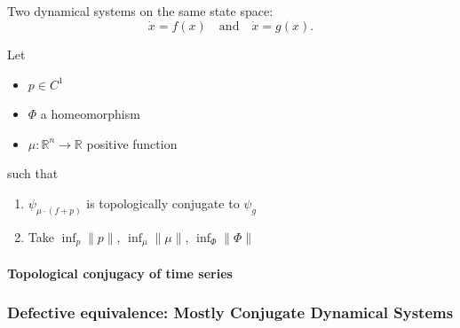 \documentclass{article}
\theoremstyle{definition} \newtheorem{definition}{Definition}  \newtheorem{example}{Example}
\theoremstyle{remark} \newtheorem{remark}{Remark}
\newcommand{\reals}{\mathbb{R}}
\newcounter{ct}
\begin{document}
\subsection{}
Two dynamical systems on the same state space:
\[
\dot{x} = f(x) \quad \text{and} \quad \dot{x} = g(x).
\]

Let 
\begin{itemize}
\item $p\in C^1$
\item $\Phi$ a homeomorphism
\item $\mu\colon \reals^n\rightarrow \reals$ positive function
\end{itemize}
such that 
\begin{enumerate}
\item $\psi_{\mu \cdot (f+p)}$ is topologically conjugate to $\psi_{g}$
\item Take $\inf_p \|p\|$, $\inf_\mu \|\mu\|$, $\inf_\Phi \|\Phi\|$
\end{enumerate}


\paragraph{Topological conjugacy of time series}
\citep{dlotko2024topconj}

\subsubsection{Defective equivalence: Mostly Conjugate Dynamical Systems}
\citep{skufca2007relaxing, skufca2008mostlyconjugate, bollt2010comparing}
\end{document}
